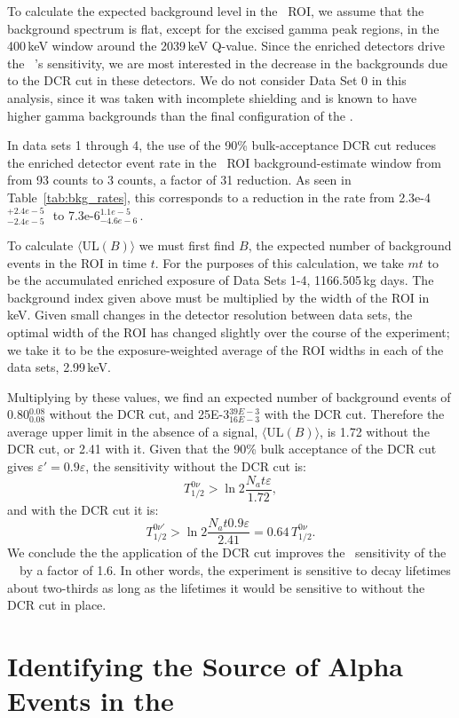To calculate the expected background level in the \nonubb\ ROI, we assume that the background spectrum is flat, except for the excised gamma peak regions, in the 400\,keV window around the 2039\,keV Q-value. Since the enriched detectors drive the \MJ\ \DEM 's sensitivity, we are most interested in the decrease in the backgrounds due to the DCR cut in these detectors. We do not consider Data Set 0 in this analysis, since it was taken with incomplete shielding and is known to have higher gamma backgrounds than the final configuration of the \DEM. 

In data sets 1 through 4, the use of the 90\% bulk-acceptance DCR cut reduces the enriched detector event rate in the \nonubb\ ROI background-estimate window from from 93 counts to 3 counts, a factor of 31 reduction. As seen in Table~\ref{tab:bkg_rates}, this corresponds to a reduction in the rate from 2.3e-4$^{+ 2.4e-5}_{-2.4e-5}$\,\cpKkgd\ to 7.3e-6$^{1.1e-5}_{-4.6e-6}$\,\cpKkgd . 

To calculate $\langle$UL$(B)\rangle$ we must first find $B$, the expected number of background events in the ROI in time $t$. For the purposes of this calculation, we take $mt$ to be the accumulated enriched exposure of Data Sets 1-4, 1166.505\,kg days. The background index given above must be multiplied by the width of the ROI in keV. Given small changes in the detector resolution between data sets, the optimal width of the ROI has changed slightly over the course of the experiment; we take it to be the exposure-weighted average of the ROI widths in each of the data sets, 2.99\,keV. 

Multiplying by these values, we find an expected number of background events of 0.80$^{0.08}_{0.08}$ without the DCR cut, and 25E-3$^{39E-3}_{16E-3}$ with the DCR cut.  Therefore the average upper limit in the absence of a signal, $\langle$UL$(B)\rangle$, is 1.72 without the DCR cut, or 2.41 with it. Given that the 90\% bulk acceptance of the DCR cut gives $\varepsilon \prime = 0.9\varepsilon$, the sensitivity without the DCR cut is:
$$T^{0\nu}_{1/2} >  \ln 2 \frac{N_a t \varepsilon }{1.72},$$
and with the DCR cut it is:
$$T^{0\nu \prime}_{1/2}  >  \ln 2 \frac{N_a t 0.9\varepsilon }{2.41} = 0.64\,T^{0\nu}_{1/2}. $$
We conclude the the application of the DCR cut improves the \nonubb\ sensitivity of the \MJ\ \DEM\ by a factor of 1.6. In other words, the experiment is sensitive to decay lifetimes about two-thirds as long as the lifetimes it would be sensitive to without the DCR cut in place. 

\section{Identifying the Source of Alpha Events in the \MJ\ \DEM\ }
